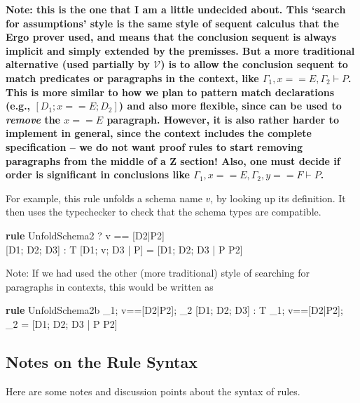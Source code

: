 \documentclass{article}
\newcommand{\V}{\mathcal{V}}
\newenvironment{zedrule}[1]{\par\textbf{rule }#1\vspace{-2ex}\infrule}{\endinfrule}
\newcommand{\derives}{\derive{}}
\newcommand{\Context}{\Gamma}
\newcommand{\proviso}{\raisebox{0.5ex}{${}_{\blacktriangleright}\ $}}%
\begin{document}
\begin{description}
  \textbf{Note: this is the one that I am a little undecided about.
  This `search for assumptions' style is the same style of sequent
  calculus that the Ergo prover used, and means that the conclusion
  sequent is always implicit and simply extended by the premisses.
  But a more traditional alternative (used partially by $\V$)
  is to allow the conclusion
  sequent to match predicates or paragraphs in the context,
  like $\Context_1, x==E, \Context_2 \vdash P$.
  This is more similar to how we plan to pattern match declarations
  (e.g., $[D_1;x==E;D_2]$) and also more flexible,
  since can be used to \emph{remove} the $x==E$ paragraph.
  However, it is also rather harder to implement in general,
  since the context includes the complete specification -- we
  do not want proof rules to start removing paragraphs from the middle of
  a Z section!  
  Also, one must decide if order is significant in conclusions like
  $\Context_1, x==E, \Context_2, y==F \vdash P$.
  }
\end{description}

For example, this rule unfolds a schema name $v$, by looking
up its definition.  It then uses the typechecker to check that 
the schema types are compatible.

\begin{zedrule}{UnfoldSchema2}
   \proviso? v == [D2|P2] \\
   \proviso [D1; D2; D3] : T
\derives
   [D1; v; D3 | P]  =  [D1; D2; D3 | P \land P2]
\end{zedrule}

Note: If we had used the other (more traditional) style of searching
for paragraphs in contexts, this would be written as
\begin{zedrule}{UnfoldSchema2b}
   \Context_1; v==[D2|P2]; \Context_2 \vdash
      \proviso [D1; D2; D3] : T
\derives
   \Context_1; v==[D2|P2]; \Context_2 \vdash
      [D1; v; D3 | P]  =  [D1; D2; D3 | P \land P2]
\end{zedrule}



\subsection{Notes on the Rule Syntax}

Here are some notes and discussion points about the syntax of rules.
\end{document}
